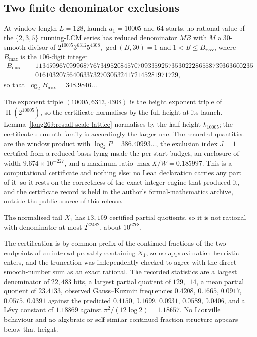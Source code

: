 \documentclass[11pt]{article}
\newcommand{\hgt}{\operatorname{H}}
\begin{document}
\subsection{Two finite denominator exclusions}

\begin{theorem}
\label{long269:res:lead-block-exclusion}
At window length $L=128$, launch $a_1=10005$ and $64$ starts, no rational value
of the $\{2,3,5\}$ running-LCM series has reduced denominator $MB$ with $M$ a
$30$-smooth divisor of $2^{10005}3^{6312}5^{4308}$, $\gcd(B,30)=1$ and
$1<B\le B_{\max}$, where $B_{\max}$ is the $106$-digit integer
\[
\begin{aligned}
 B_{\max}={}&1134599670999687767349520845707093359257353022286558739363600235\\
 &016103207564063373270305324172145281971729 ,
\end{aligned}
\]
so that $\log_2B_{\max}=348.9846\ldots$
\end{theorem}

The exponent triple $(10005,6312,4308)$ is the height exponent triple of
$\hgt(2^{10005})$, so the certificate normalises by the full height at its
launch.  Lemma~\ref{long269:res:all-scale-lattice} normalises by the half height
$h_{10005}$; the certificate's smooth family is accordingly the larger one.  The recorded quantities are the window product with
$\log_2P=386.40993\ldots$, the exclusion index $J=1$ certified from a reduced
basis lying inside the per-start budget, an enclosure of width
$9.674\times10^{-227}$, and a maximum ratio $\max X/W=0.185997$.  This is a
computational certificate and nothing else: no Lean declaration carries any
part of it, so it rests on the correctness of the exact integer engine that
produced it, and the certificate record is held in the author's
formal-mathematics archive, outside the public source of this release.

\begin{theorem}
\label{long269:res:cf-exclusion}
The normalised tail $X_1$ has $13{,}109$ certified partial quotients, so it is
not rational with denominator at most $2^{22482}$, about $10^{6768}$.
\end{theorem}

The certification is by common prefix of the continued fractions of the two
endpoints of an interval provably containing $X_1$, so no approximation
heuristic enters, and the truncation was independently checked to agree with
the direct smooth-number sum as an exact rational.  The recorded statistics are
a largest denominator of $22{,}483$ bits, a largest partial quotient of
$129{,}114$, a mean partial quotient of $23.4133$, observed Gauss--Kuzmin
frequencies $0.4208$, $0.1665$, $0.0917$, $0.0575$, $0.0391$ against the
predicted $0.4150$, $0.1699$, $0.0931$, $0.0589$, $0.0406$, and a L\'evy
constant of $1.18869$ against $\pi^{2}/(12\log2)=1.18657$.  No Liouville
behaviour and no algebraic or self-similar continued-fraction structure appears
below that height.
\end{document}

